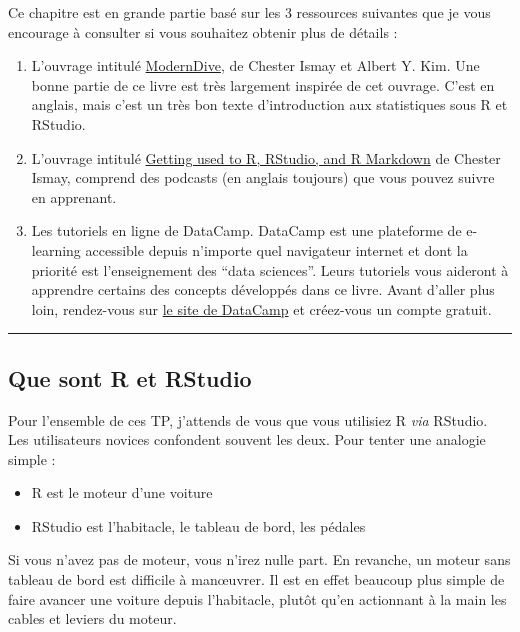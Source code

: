 \documentclass[
  a4paper,
]{article}
\providecommand{\tightlist}{%
  \setlength{\itemsep}{0pt}\setlength{\parskip}{0pt}}
\begin{document}
Ce chapitre est en grande partie basé sur les 3 ressources suivantes que je vous encourage à consulter si vous souhaitez obtenir plus de détails :

\begin{enumerate}
\def\labelenumi{\arabic{enumi}.}
\tightlist
\item
  L'ouvrage intitulé \href{https://moderndive.com/index.html}{ModernDive}, de Chester Ismay et Albert Y. Kim. Une bonne partie de ce livre est très largement inspirée de cet ouvrage. C'est en anglais, mais c'est un très bon texte d'introduction aux statistiques sous R et RStudio.
\item
  L'ouvrage intitulé \href{https://ismayc.github.io/rbasics-book/}{Getting used to R, RStudio, and R Markdown} de Chester Ismay, comprend des podcasts (en anglais toujours) que vous pouvez suivre en apprenant.
\item
  Les tutoriels en ligne de DataCamp. DataCamp est une plateforme de e-learning accessible depuis n'importe quel navigateur internet et dont la priorité est l'enseignement des ``data sciences''. Leurs tutoriels vous aideront à apprendre certains des concepts développés dans ce livre. Avant d'aller plus loin, rendez-vous sur \href{https://www.datacamp.com/}{le site de DataCamp} et créez-vous un compte gratuit.
\end{enumerate}

\begin{center}\rule{0.5\linewidth}{0.5pt}\end{center}

\hypertarget{que-sont-r-et-rstudio}{%
\subsection{Que sont R et RStudio}\label{que-sont-r-et-rstudio}}

Pour l'ensemble de ces TP, j'attends de vous que vous utilisiez R \emph{via} RStudio. Les utilisateurs novices confondent souvent les deux. Pour tenter une analogie simple :

\begin{itemize}
\tightlist
\item
  R est le moteur d'une voiture
\item
  RStudio est l'habitacle, le tableau de bord, les pédales
\end{itemize}

Si vous n'avez pas de moteur, vous n'irez nulle part. En revanche, un moteur sans tableau de bord est difficile à manœuvrer. Il est en effet beaucoup plus simple de faire avancer une voiture depuis l'habitacle, plutôt qu'en actionnant à la main les cables et leviers du moteur.
\end{document}
